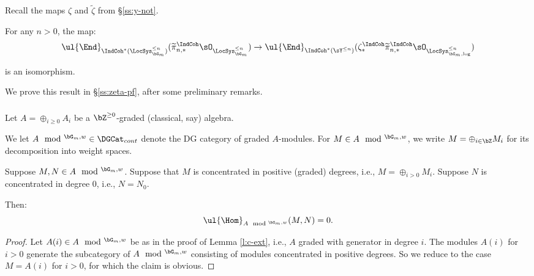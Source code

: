 Recall the maps $\zeta$ and $\widetilde{\zeta}$ from \S \ref{ss:y-not}.

\begin{prop}
\notready\label{p:zeta}

For any $n > 0$, the map:
%
\[
\ul{\End}_{\IndCoh^*(\LocSys_{\bG_m}^{\leq n})}(
\widetilde{\pi}_{n,*}^{\IndCoh}\sO_{\LocSys_{\bG_m}^{\leq n}}) \to
\ul{\End}_{\IndCoh^*(\sY^{\leq n})}(
\zeta_*^{\IndCoh}\widetilde{\pi}_{n,*}^{\IndCoh}
\sO_{\LocSys_{\bG_m,\log}^{\leq n}})
\]

 is an isomorphism.

\end{prop}

We prove this result in \S \ref{ss:zeta-pf}, after some
preliminary remarks.

\subsubsection{}

Let $A = \oplus_{i \geq 0} A_i $ be a
$\bZ^{\geq 0}$-graded (classical, say) algebra.

We let $A\mod^{\bG_m,w} \in \DGCat_{cont}$ denote the
DG category of graded $A$-modules. For $M \in A\mod^{\bG_m,w}$,
we write $M = \oplus_{i \in \bZ} M_i$ for its
decomposition into weight spaces.

\begin{lem}
\notready\label{l:gr-hom}

Suppose $M,N \in A\mod^{\bG_m,w}$. Suppose that
$M$ is concentrated in positive (graded) degrees,
i.e., $M = \oplus_{i>0} M_i$. Suppose $N$ is concentrated
in degree $0$, i.e., $N = N_0$.

Then:
%
\[
\ul{\Hom}_{A\mod^{\bG_m,w}}(M,N) = 0.
\]

\end{lem}

\begin{proof}

Let $A(i) \in A\mod^{\bG_m,w}$ be as in the proof of Lemma \ref{l:c-ext}, i.e.,
$A$ graded with generator in degree $i$. The modules $A(i)$ for $i > 0$
generate the subcategory of $A\mod^{\bG_m,w}$ consisting of modules concentrated
in positive degrees. So we reduce to the case $M = A(i)$ for $i>0$, for which the claim is obvious.

\end{proof}

\subsubsection{}

